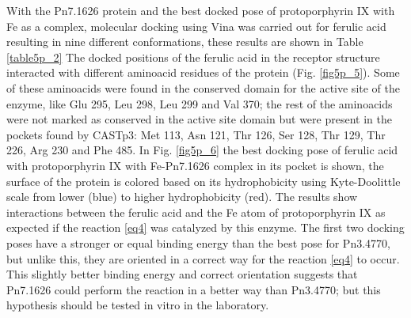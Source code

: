\documentclass[12pt]{article}
\begin{document}
	With the Pn7.1626 protein and the best docked pose of protoporphyrin IX with Fe as a complex, molecular docking using Vina was carried out for ferulic acid resulting in nine different conformations, these results are shown in Table \ref{table5p_2} The docked positions of the ferulic acid in the receptor structure interacted with different aminoacid residues of the protein (Fig. \ref{fig5p_5}). Some of these aminoacids were found in the conserved domain for the active site of the enzyme, like Glu 295, Leu 298, Leu 299 and Val 370; the rest of the aminoacids were not marked as conserved in the active site domain but were present in the pockets found by CASTp3: Met 113, Asn 121, Thr 126, Ser 128, Thr 129, Thr 226, Arg 230 and Phe 485. In Fig. \ref{fig5p_6} the best docking pose of ferulic acid with protoporphyrin IX with Fe-Pn7.1626 complex in its pocket is shown, the surface of the protein is colored based on its hydrophobicity using Kyte-Doolittle scale from lower (blue) to higher hydrophobicity (red). The results show interactions between the ferulic acid and the Fe atom of protoporphyrin IX as expected if the reaction \ref{eq4} was catalyzed by this enzyme. The first two docking poses have a stronger or equal binding energy than the best pose for Pn3.4770, but unlike this, they are oriented in a correct way for the reaction \ref{eq4} to occur. This slightly better binding energy and correct orientation suggests that Pn7.1626 could perform the reaction in a better way than Pn3.4770; but this hypothesis should be tested in vitro in the laboratory. 
	
	
	
\end{document}
